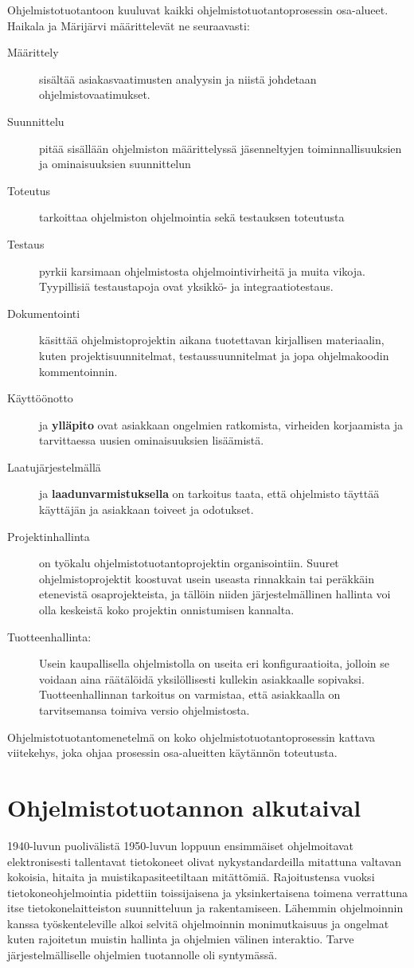 \documentclass[finnish,12pt]{tktltiki2}
\theoremstyle{definition}
\theoremstyle{remark}
\begin{document}
Ohjelmistotuotantoon kuuluvat kaikki ohjelmistotuotantoprosessin osa-alueet. Haikala ja Märijärvi \cite{haikala2003ohjelmistotuotanto} määrittelevät ne seuraavasti:

\begin{description}
\item[Määrittely] sisältää asiakasvaatimusten analyysin ja niistä johdetaan ohjelmistovaatimukset.
\item[Suunnittelu] pitää sisällään ohjelmiston määrittelyssä jäsenneltyjen toiminnallisuuksien ja ominaisuuksien suunnittelun
\item[Toteutus] tarkoittaa ohjelmiston ohjelmointia sekä testauksen toteutusta
\item[Testaus] pyrkii karsimaan ohjelmistosta ohjelmointivirheitä ja muita vikoja. Tyypillisiä testaustapoja ovat yksikkö- ja integraatiotestaus.
\item[Dokumentointi] käsittää ohjelmistoprojektin aikana tuotettavan kirjallisen materiaalin, kuten projektisuunnitelmat, testaussuunnitelmat ja jopa ohjelmakoodin kommentoinnin.
\item[Käyttöönotto] ja \textbf{ylläpito} ovat asiakkaan ongelmien ratkomista, virheiden korjaamista ja tarvittaessa uusien ominaisuuksien lisäämistä.  
\item[Laatujärjestelmällä] ja \textbf{laadunvarmistuksella} on tarkoitus taata, että ohjelmisto täyttää käyttäjän ja asiakkaan toiveet ja odotukset.
\item[Projektinhallinta] on työkalu ohjelmistotuotantoprojektin organisointiin. Suuret ohjelmistoprojektit koostuvat usein useasta rinnakkain tai peräkkäin etenevistä osaprojekteista, ja tällöin niiden järjestelmällinen hallinta voi olla keskeistä koko projektin onnistumisen kannalta. 
\item[Tuotteenhallinta:] Usein kaupallisella ohjelmistolla on useita eri konfiguraatioita, jolloin se voidaan aina räätälöidä yksilöllisesti kullekin asiakkaalle sopivaksi. Tuotteenhallinnan tarkoitus on varmistaa, että asiakkaalla on tarvitsemansa toimiva versio ohjelmistosta.
\end{description}
Ohjelmistotuotantomenetelmä on koko ohjelmistotuotantoprosessin kattava viitekehys, joka ohjaa prosessin osa-alueitten käytännön toteutusta.

\section{Ohjelmistotuotannon alkutaival}
1940-luvun puolivälistä 1950-luvun loppuun ensimmäiset ohjelmoitavat elektronisesti tallentavat tietokoneet olivat nykystandardeilla mitattuna valtavan kokoisia, hitaita ja muistikapasiteetiltaan mitättömiä. Rajoitustensa vuoksi tietokoneohjelmointia pidettiin toissijaisena ja yksinkertaisena toimena verrattuna itse tietokonelaitteiston suunnitteluun ja rakentamiseen. \cite{DBLP:reference/se/Grier10} Lähemmin ohjelmoinnin kanssa työskenteleville alkoi selvitä ohjelmoinnin monimutkaisuus ja ongelmat kuten rajoitetun muistin hallinta ja ohjelmien välinen interaktio. Tarve järjestelmälliselle ohjelmien tuotannolle oli syntymässä.
\end{document}
